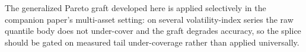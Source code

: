 The generalized Pareto graft developed here is applied selectively in
the companion paper's multi-asset setting: on several volatility-index
series the raw quantile body does not under-cover and the graft degrades
accuracy, so the splice should be gated on measured tail under-coverage
rather than applied universally.

